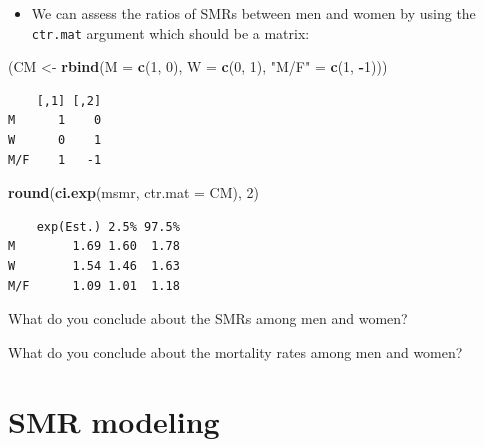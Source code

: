 \documentclass[
]{book}
\newenvironment{Shaded}{\begin{snugshade}}{\end{snugshade}}
\newcommand{\AttributeTok}[1]{\textcolor[rgb]{0.13,0.29,0.53}{#1}}
\newcommand{\DecValTok}[1]{\textcolor[rgb]{0.00,0.00,0.81}{#1}}
\newcommand{\FunctionTok}[1]{\textcolor[rgb]{0.13,0.29,0.53}{\textbf{#1}}}
\newcommand{\NormalTok}[1]{#1}
\newcommand{\OtherTok}[1]{\textcolor[rgb]{0.56,0.35,0.01}{#1}}
\newcommand{\SpecialCharTok}[1]{\textcolor[rgb]{0.81,0.36,0.00}{\textbf{#1}}}
\newcommand{\StringTok}[1]{\textcolor[rgb]{0.31,0.60,0.02}{#1}}
\providecommand{\tightlist}{%
  \setlength{\itemsep}{0pt}\setlength{\parskip}{0pt}}
\theoremstyle{definition}
\theoremstyle{definition}
\theoremstyle{definition}
\theoremstyle{definition}
\theoremstyle{remark}
\begin{document}
\begin{enumerate}
  \begin{itemize}
  \tightlist
  \item
    We can assess the ratios of SMRs between men and women by using the
    \texttt{ctr.mat} argument which should be a matrix:
  \end{itemize}

\begin{Shaded}
\begin{Highlighting}[]
\NormalTok{(CM }\OtherTok{\textless{}{-}} \FunctionTok{rbind}\NormalTok{(}\AttributeTok{M =} \FunctionTok{c}\NormalTok{(}\DecValTok{1}\NormalTok{, }\DecValTok{0}\NormalTok{),}
             \AttributeTok{W =} \FunctionTok{c}\NormalTok{(}\DecValTok{0}\NormalTok{, }\DecValTok{1}\NormalTok{),}
         \StringTok{"M/F"} \OtherTok{=} \FunctionTok{c}\NormalTok{(}\DecValTok{1}\NormalTok{, }\SpecialCharTok{{-}}\DecValTok{1}\NormalTok{)))}
\end{Highlighting}
\end{Shaded}

\begin{verbatim}
    [,1] [,2]
M      1    0
W      0    1
M/F    1   -1
\end{verbatim}

\begin{Shaded}
\begin{Highlighting}[]
\FunctionTok{round}\NormalTok{(}\FunctionTok{ci.exp}\NormalTok{(msmr, }\AttributeTok{ctr.mat =}\NormalTok{ CM), }\DecValTok{2}\NormalTok{)}
\end{Highlighting}
\end{Shaded}

\begin{verbatim}
    exp(Est.) 2.5% 97.5%
M        1.69 1.60  1.78
W        1.54 1.46  1.63
M/F      1.09 1.01  1.18
\end{verbatim}

  What do you conclude about the SMRs among men and women?

  What do you conclude about the mortality rates among men and women?
\end{enumerate}

\section{SMR modeling}\label{smr-modeling}
\end{document}
